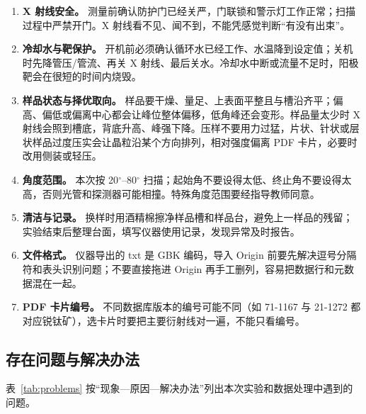 \begin{enumerate}[label=（\arabic*）,leftmargin=2.2em]
  \item \textbf{X 射线安全。} 测量前确认防护门已经关严，门联锁和警示灯工作正常；扫描过程中严禁开门。X 射线看不见、闻不到，不能凭感觉判断“有没有出束”。
  \item \textbf{冷却水与靶保护。} 开机前必须确认循环水已经工作、水温降到设定值；关机时先降管压/管流、再关 X 射线、最后关水。冷却水中断或流量不足时，阳极靶会在很短的时间内烧毁。
  \item \textbf{样品状态与择优取向。} 样品要干燥、量足、上表面平整且与槽沿齐平；偏高、偏低或偏离中心都会让峰位整体偏移，低角峰还会变形。样品量太少时 X 射线会照到槽底，背底升高、峰强下降。压样不要用力过猛，片状、针状或层状样品过度压实会让晶粒沿某个方向排列，相对强度偏离 PDF 卡片，必要时改用侧装或轻压。
  \item \textbf{角度范围。} 本次按 20$^\circ$--80$^\circ$ 扫描；起始角不要设得太低、终止角不要设得太高，否则光管和探测器可能相撞。特殊角度范围要经指导教师同意。
  \item \textbf{清洁与记录。} 换样时用酒精棉擦净样品槽和样品台，避免上一样品的残留；实验结束后整理台面，填写仪器使用记录，发现异常及时报告。
  \item \textbf{文件格式。} 仪器导出的 txt 是 GBK 编码，导入 Origin 前要先解决逗号分隔符和表头识别问题；不要直接拖进 Origin 再手工删列，容易把数据行和元数据混在一起。
  \item \textbf{PDF 卡片编号。} 不同数据库版本的编号可能不同（如 71-1167 与 21-1272 都对应锐钛矿），选卡片时要把主要衍射线对一遍，不能只看编号。
\end{enumerate}

\subsection{存在问题与解决办法}

表~\ref{tab:problems} 按“现象—原因—解决办法”列出本次实验和数据处理中遇到的问题。

